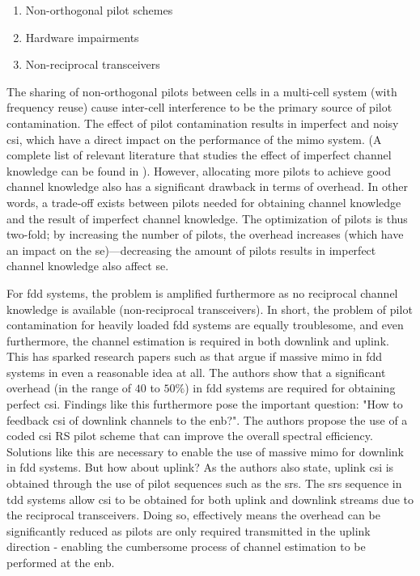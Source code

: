 \begin{enumerate}
    \item Non-orthogonal pilot schemes
    \item Hardware impairments
    \item Non-reciprocal transceivers
\end{enumerate}

The sharing of non-orthogonal pilots between cells in a multi-cell system (with frequency reuse) cause inter-cell interference to be the primary source of pilot contamination. The effect of pilot contamination results in imperfect and noisy \gls{csi}, which have a direct impact on the performance of the \gls{mimo} system. (A complete list of relevant literature that studies the effect of imperfect channel knowledge can be found in \cite{Elijah2016ASystem}). However, allocating more pilots to achieve good channel knowledge also has a significant drawback in terms of overhead. In other words, a trade-off exists between pilots needed for obtaining channel knowledge and the result of imperfect channel knowledge. The optimization of pilots is thus two-fold; by increasing the number of pilots, the overhead increases (which have an impact on the \gls{se})—decreasing the amount of pilots results in imperfect channel knowledge also affect \gls{se}.

For \gls{fdd} systems, the problem is amplified furthermore as no reciprocal channel knowledge is available (non-reciprocal transceivers). In short, the problem of pilot contamination for heavily loaded \gls{fdd} systems are equally troublesome, and even furthermore, the channel estimation is required in both downlink and uplink. This has sparked research papers such as \cite{ZirwasKeySystem} that argue if massive \gls{mimo} in \gls{fdd} systems in even a reasonable idea at all. The authors show that a significant overhead (in the range of  $40$ to $50\%$) in \gls{fdd} systems are required for obtaining perfect \gls{csi}. Findings like this furthermore pose the important question: "How to feedback \gls{csi} of downlink channels to the \gls{enb}?". The authors propose the use of a coded \gls{csi} RS pilot scheme that can improve the overall spectral efficiency. Solutions like this are necessary to enable the use of massive \gls{mimo} for downlink in \gls{fdd} systems. But how about uplink? As the authors also state, uplink \gls{csi} is obtained through the use of pilot sequences such as the \gls{srs}. The \gls{srs} sequence in \gls{tdd} systems allow \gls{csi} to be obtained for both uplink and downlink streams due to the reciprocal transceivers. Doing so, effectively means the overhead can be significantly reduced as pilots are only required transmitted in the uplink direction - enabling the cumbersome process of channel estimation to be performed at the \gls{enb}. 

